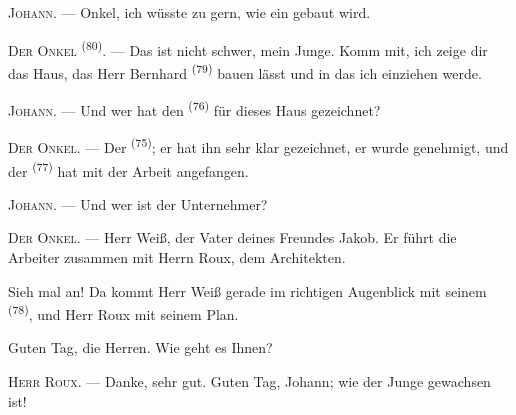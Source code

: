 %

\VUsaut{6.0mm}
\VUsaut{1.4mm}
\VUsaut{2.2mm}

\VUsaut{3.0mm}

\textsc{Johann}. --- Onkel, ich wüsste zu gern, wie ein  gebaut wird.

\textsc{Der Onkel} \textsuperscript{(80)}. --- Das ist nicht schwer, mein Junge. Komm
mit, ich zeige dir das Haus, das Herr Bernhard \textsuperscript{(79)} bauen lässt
und in das ich einziehen werde.

\textsc{Johann}. --- Und wer hat den  \textsuperscript{(76)} für dieses
Haus gezeichnet?

\textsc{Der Onkel}. --- Der  \textsuperscript{(75)}; er hat ihn sehr
klar gezeichnet, er wurde genehmigt, und der 
\textsuperscript{(77)} hat mit der Arbeit angefangen.

\textsc{Johann}. --- Und wer ist der Unternehmer?

\textsc{Der Onkel}. --- Herr Weiß, der Vater deines Freundes Jakob. Er führt die
Arbeiter zusammen mit Herrn Roux, dem Architekten.

Sieh mal an! Da kommt Herr Weiß gerade im richtigen Augenblick mit seinem
 \textsuperscript{(78)}, und Herr Roux mit seinem Plan.

Guten Tag, die Herren. Wie geht es Ihnen?

\textsc{Herr Roux}. --- Danke, sehr gut. Guten Tag, Johann; wie der Junge gewachsen
ist!


